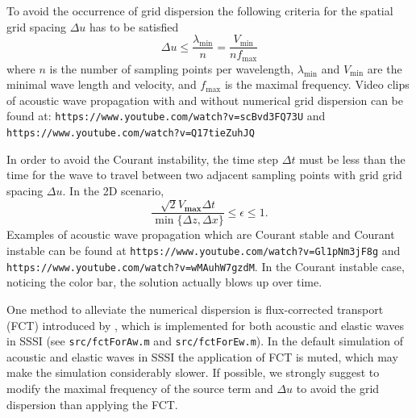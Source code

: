 \documentclass[12pt]{article}
\theoremstyle{plain}
\theoremstyle{definition}
\theoremstyle{remark}
\numberwithin{equation}{section}
\begin{document}
To avoid the occurrence of grid dispersion the following criteria for the spatial grid spacing $\Delta u$ has to be satisfied
\begin{equation}
  \Delta u \leq \frac{\lambda_{\min}}{n} = \frac{V_{\min}}{nf_{\max}}
\end{equation}
where $n$ is the number of sampling points per wavelength, $\lambda_{\min}$ and $V_{\min}$ are the minimal wave length and velocity, and $f_{\max}$ is the maximal frequency. 
Video clips of acoustic wave propagation with and without numerical grid dispersion can be found at:
\texttt{https://www.youtube.com/watch?v=scBvd3FQ73U} and \texttt{https://www.youtube.com/watch?v=Q17tieZuhJQ}

In order to avoid the Courant instability, the time step $\Delta t$ must be less than the time for the wave to travel between two 
adjacent sampling points with grid grid spacing $\Delta u$. In the 2D scenario,
\begin{equation}
\frac{\sqrt{2}V_{\textbf{max}}\Delta t}{\min\{\Delta z, \Delta x\}}\le \epsilon \le 1.
\end{equation}
Examples of acoustic wave propagation which are Courant stable and Courant instable can be found at
\texttt{https://www.youtube.com/watch?v=Gl1pNm3jF8g}  and \texttt{https://www.youtube.com/watch?v=wMAuhW7gzdM}. 
In the Courant instable case, noticing the color bar, the solution actually blows up over time.

One method to alleviate the numerical dispersion is flux-corrected transport (FCT) introduced by \cite{FeiLar1995}, 
which is implemented for both acoustic and elastic waves in SSSI (see \texttt{src/fctForAw.m} and \texttt{src/fctForEw.m}).
In the default simulation of acoustic and elastic waves in SSSI the application of FCT is muted, which may make the simulation 
considerably slower. If possible, we strongly suggest to modify the maximal frequency of the source term and $\Delta u$ 
to avoid the grid dispersion than applying the FCT.  
\end{document}
